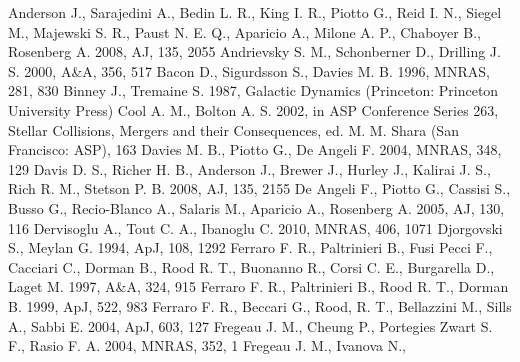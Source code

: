 \begin{thebibliography}{99}

  Anderson J.,  Sarajedini A., Bedin L. R., King I. R., Piotto G.,
  Reid I. N., Siegel M., Majewski S. R., Paust N. E. Q., Aparicio A.,
  Milone A. P., Chaboyer B., Rosenberg A. 2008, AJ, 135, 2055
 Andrievsky S. M.,
  Schonberner D., Drilling J. S. 2000, A\&A, 356, 517
 Bacon
  D., Sigurdsson S., Davies M. B. 1996, MNRAS, 281, 830
 Binney J., Tremaine S. 1987,
  Galactic Dynamics (Princeton: Princeton University Press)
 Cool A. M., Bolton
  A. S. 2002, in ASP Conference Series 263, Stellar Collisions,
  Mergers and their Consequences, ed. M. M. Shara (San Francisco:
  ASP), 163
 Davies M. B., Piotto G., De Angeli
  F. 2004, MNRAS, 348, 129
  Davis D. S., Richer H. B., Anderson J., Brewer J., Hurley J.,
  Kalirai J. S., Rich R. M., Stetson P. B. 2008, AJ, 135, 2155
  De Angeli F., Piotto G., Cassisi S., Busso G., Recio-Blanco A.,
  Salaris M., Aparicio A., Rosenberg A. 2005, AJ, 130, 116
 Dervisoglu A., Tout C. A., Ibanoglu
  C. 2010, MNRAS, 406, 1071
 Djorgovski S., Meylan G. 1994, ApJ, 108, 1292
  Ferraro F. R., Paltrinieri B., Fusi Pecci F., Cacciari C., Dorman
  B., Rood R. T., Buonanno R., Corsi C. E., Burgarella D., Laget
  M. 1997, A\&A, 324, 915
  Ferraro F. R., Paltrinieri B., Rood R. T., Dorman B. 1999, ApJ, 522,
  983
  Ferraro F. R., Beccari G., Rood, R. T., Bellazzini M., Sills A.,
  Sabbi E. 2004, ApJ, 603, 127
 Fregeau J. M., Cheung P.,
  Portegies Zwart S. F., Rasio F. A. 2004, MNRAS, 352, 1
 Fregeau J. M., Ivanova N.,

\end{thebibliography}
